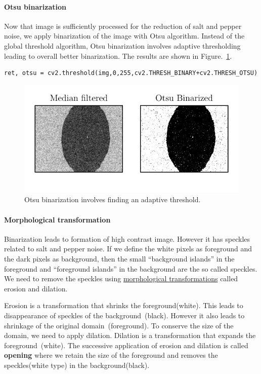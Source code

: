 \documentclass[12pt, twoside, a4paper]{article}
\begin{document}
\paragraph{Otsu binarization}
Now that image is sufficiently processed for the reduction of salt and pepper noise, we apply binarization of the image with Otsu algorithm. Instead of the global threshold algorithm, Otsu binarization involves adaptive thresholding leading to overall better binarization. The results are shown in Figure.~\ref{openCV Otsu binarization}.
%
\begin{verbatim}
ret, otsu = cv2.threshold(img,0,255,cv2.THRESH_BINARY+cv2.THRESH_OTSU)
\end{verbatim}
%
%
\begin{figure}[!htbp]
	\centering
	\includegraphics[scale=1.0]{figures/04_BinaryOtsuEffect.pdf}
	\caption{Otsu binarization involves finding an adaptive threshold.
	}
	\label{openCV Otsu binarization}
\end{figure}
%
\paragraph{Morphological transformation}
Binarization leads to formation of high contrast image. However it has speckles related to salt and pepper noise. If we define the white pixels as foreground and the dark pixels as background, then the small ``background islands'' in the foreground and ``foreground islands'' in the background are the so called speckles.  We need to remove the speckles using \href{https://docs.opencv.org/trunk/d9/d61/tutorial_py_morphological_ops.html}{morphological transformations} called erosion and dilation. 

Erosion is a transformation that shrinks the foreground(white). This leads to disappearance of speckles of the background~(black). However it also leads to shrinkage of the original domain~(foreground). To conserve the size of the domain, we need to apply dilation. Dilation is a transformation that expands the foreground~(white). The successive application of erosion and dilation is called \textbf{opening} where we retain the size of the foreground and removes the speckles(white type) in the background(black). 
\end{document}
